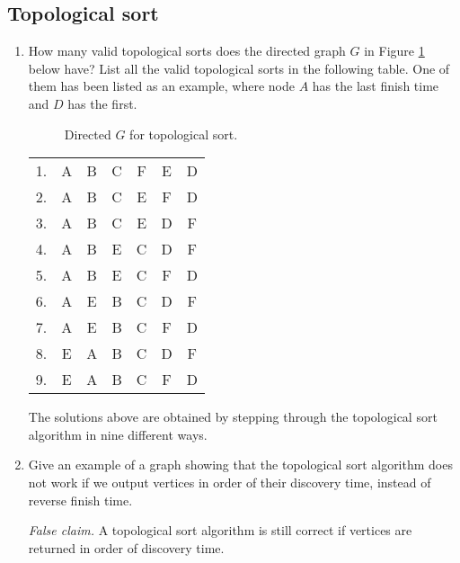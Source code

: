 \subsection{Topological sort}
\begin{enumerate}
    \item How many valid topological sorts does the directed graph $G$ in Figure \ref{fig:topo-sort} below have? List all the valid topological sorts in the following table. One of them has been listed as an example, where node $A$ has the last finish time and $D$ has the first.

    \begin{figure}[H]
        \centering
        \caption{Directed $G$ for topological sort.}
        \label{fig:topo-sort}
    \end{figure}
    
     \begin{center}
    \begin{tabular}{c c c c c c c}
    \hline
     1. & A & B & C & F & E & D\\
     2. & A & B & C & E & F & D\\
     3. & A & B & C & E & D & F\\
     4. & A & B & E & C & D & F\\
     5. & A & B & E & C & F & D\\
     6. & A & E & B & C & D & F\\
     7. & A & E & B & C & F & D\\
     8. & E & A & B & C & D & F\\
     9. & E & A & B & C & F & D\\
    \hline
    \end{tabular}
    \label{table:q3}
    \end{center}
\begin{solution}
The solutions above are obtained by stepping through the topological sort algorithm in nine different ways.
\end{solution}
\item 
Give an example of a graph showing that the topological sort algorithm does not work if we output vertices in order of their discovery time, instead of reverse finish time.
\begin{solution}
\textit{False claim. }A topological sort algorithm is still correct if vertices are returned in order of discovery time.


\end{solution}
\end{enumerate}
